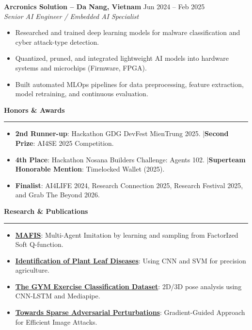 \documentclass[10pt,a4paper]{article}
\newcommand{\sectionhr}[1]{%
  \vspace{0.4em}\noindent\textbf{\large #1}\par
  \vspace{0.2em}\hrule\vspace{0.4em}
}
\begin{document}
\vspace{0.3em}
\textbf{Arcronics Solution – Da Nang, Vietnam} \hfill Jun 2024 -- Feb 2025 \\
\emph{Senior AI Engineer / Embedded AI Specialist}
\begin{itemize}
\item Researched and trained deep learning models for malware classification and cyber attack-type detection.
\item Quantized, pruned, and integrated lightweight AI models into hardware systems and microchips (Firmware, FPGA).
\item Built automated MLOps pipelines for data preprocessing, feature extraction, model retraining, and continuous evaluation.
\end{itemize}

\sectionhr{Honors \& Awards}
\begin{itemize}[leftmargin=0pt, label=]
\item \textbf{2nd Runner-up}: Hackathon GDG DevFest MienTrung 2025. \quad|\quad \textbf{Second Prize}: AI4SE 2025 Competition.
\item \textbf{4th Place}: Hackathon Nosana Builders Challenge: Agents 102. \quad|\quad \textbf{Superteam Honorable Mention}: Timelocked Wallet (2025).
\item \textbf{Finalist}: AI4LIFE 2024, Research Connection 2025, Research Festival 2025, and Grab The Beyond 2026.
\end{itemize}

\sectionhr{Research \& Publications}
\begin{itemize}[leftmargin=0pt, label=]
\item \href{https://drive.google.com/file/d/1f-_lmgSBEQNiokMz5ruVxllKGePAKLLs/view?usp=drive_link}{\textbf{MAFIS}}: Multi-Agent Imitation by learning and sampling from FactorIzed Soft Q-function.
\item \href{https://drive.google.com/file/d/1C1UmtYmYN1q72dGiZ-QnILFhtghNS1Vg/view?usp=drive_link}{\textbf{Identification of Plant Leaf Diseases}}: Using CNN and SVM for precision agriculture.
\item \href{https://drive.google.com/file/d/1L5Vi10YiWKZArKmDK_A7PQRQ3pDMiLGO/view?usp=drive_link}{\textbf{The GYM Exercise Classification Dataset}}: 2D/3D pose analysis using CNN-LSTM and Mediapipe.
\item \href{https://drive.google.com/file/d/1DitwY3fDwt5S5XOb4LiS2O0MDBZtA2lA/view?usp=drive_link}{\textbf{Towards Sparse Adversarial Perturbations}}: Gradient-Guided Approach for Efficient Image Attacks.
\end{itemize}
\end{document}
